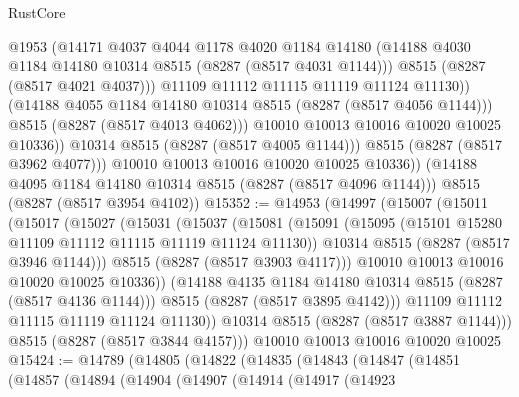 \begin{lexlean}{RustCore}
\begin{coremodule}
                      @1953
                      (@14171
                        @4037
                        @4044
                        @1178
                        @4020
                        @1184
                        @14180
                        (@14188 @4030 @1184 @14180 @10314 @8515 (@8287 (@8517 @4031 @1144)))
                        @8515
                        (@8287 (@8517 @4021 @4037)))
                      @11109
                      @11112
                      @11115
                      @11119
                      @11124
                      @11130))
                  (@14188 @4055 @1184 @14180 @10314 @8515 (@8287 (@8517 @4056 @1144)))
                  @8515
                  (@8287 (@8517 @4013 @4062)))
                @10010
                @10013
                @10016
                @10020
                @10025
                @10336))
            @10314
            @8515
            (@8287 (@8517 @4005 @1144)))
          @8515
          (@8287 (@8517 @3962 @4077)))
        @10010
        @10013
        @10016
        @10020
        @10025
        @10336))
    (@14188 @4095 @1184 @14180 @10314 @8515 (@8287 (@8517 @4096 @1144)))
    @8515
    (@8287 (@8517 @3954 @4102))
@15352 := @14953
    (@14997
      (@15007
        (@15011
          (@15017
            (@15027
              (@15031
                (@15037
                  (@15081
                    (@15091
                      (@15095 (@15101 @15280 @11109 @11112 @11115 @11119 @11124 @11130))
                      @10314
                      @8515
                      (@8287 (@8517 @3946 @1144)))
                    @8515
                    (@8287 (@8517 @3903 @4117)))
                  @10010
                  @10013
                  @10016
                  @10020
                  @10025
                  @10336))
              (@14188 @4135 @1184 @14180 @10314 @8515 (@8287 (@8517 @4136 @1144)))
              @8515
              (@8287 (@8517 @3895 @4142)))
            @11109
            @11112
            @11115
            @11119
            @11124
            @11130))
        @10314
        @8515
        (@8287 (@8517 @3887 @1144)))
      @8515
      (@8287 (@8517 @3844 @4157)))
    @10010
    @10013
    @10016
    @10020
    @10025
@15424 := @14789
    (@14805
      (@14822
        (@14835
          (@14843
            (@14847
              (@14851
                (@14857
                  (@14894
                    (@14904
                      (@14907
                        (@14914
                          (@14917
                            (@14923

\end{coremodule}
\end{lexlean}

